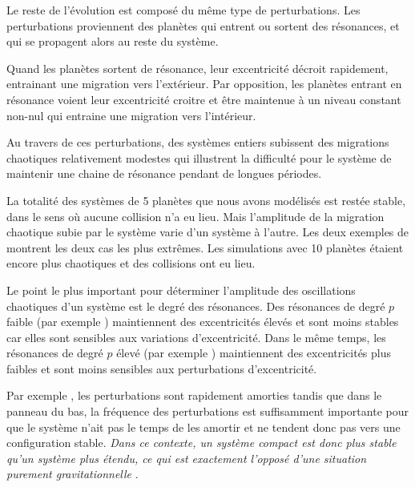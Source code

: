 \bigskip

Le reste de l'évolution est composé du même type de perturbations. Les perturbations proviennent des planètes qui entrent ou sortent des résonances, et qui se propagent alors au reste du système. 

Quand les planètes sortent de résonance, leur excentricité décroit rapidement, entrainant une migration vers l'extérieur. Par opposition, les planètes entrant en résonance voient leur excentricité croitre et être maintenue à un niveau constant non-nul qui entraine une migration vers l'intérieur. 

Au travers de ces perturbations, des systèmes entiers subissent des migrations chaotiques relativement modestes qui illustrent la difficulté pour le système de maintenir une chaine de résonance pendant de longues périodes. 

La totalité des systèmes de 5 planètes que nous avons modélisés est restée stable, dans le sens où aucune collision n'a eu lieu. Mais l'amplitude de la migration chaotique subie par le système varie d'un système à l'autre. Les deux exemples de  montrent les deux cas les plus extrêmes. Les simulations avec 10 planètes étaient encore plus chaotiques et des collisions ont eu lieu. 

\bigskip

Le point le plus important pour déterminer l'amplitude des oscillations chaotiques d'un système est le degré des résonances. Des résonances de degré $p$ faible (par exemple ) maintiennent des excentricités élevés et sont moins stables car elles sont sensibles aux variations d'excentricité. Dans le même temps, les résonances de degré $p$ élevé (par exemple ) maintiennent des excentricités plus faibles et sont moins sensibles aux perturbations d'excentricité.

Par exemple , les perturbations sont rapidement amorties tandis que dans le panneau du bas, la fréquence des perturbations est suffisamment importante pour que le système n'ait pas le temps de les amortir et ne tendent donc pas vers une configuration stable. \emph{Dans ce contexte, un système compact est donc plus stable qu'un système plus étendu, ce qui est exactement l'opposé d'une situation purement gravitationnelle} \citep{marchal1982hill}.

